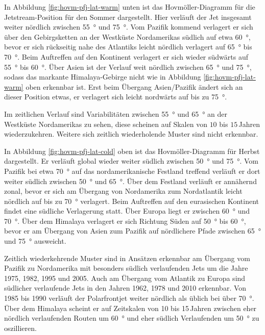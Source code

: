 In Abbildung \ref{fig:hovm-pfj-lat-warm} unten ist das Hovmöller-Diagramm für die Jetstream-Position für den Sommer dargestellt. Hier verläuft der Jet insgesamt weiter nördlich zwischen \SI{55}{\degree} und \SI{75}{\degree}. Vom Pazifik kommend verlagert er sich über den Gebirgsketten an der Westküste Nordamerikas südlich auf etwa \SI{60}{\degree}, bevor er sich rückseitig nahe des Atlantiks leicht nördlich verlagert auf \SI{65}{\degree} bis \SI{70}{\degree}. Beim Auftreffen auf den Kontinent verlagert er sich wieder südwärts auf \SI{55}{\degree} bis \SI{60}{\degree}. Über Asien ist der Verlauf weit nördlich zwischen \SI{65}{\degree} und \SI{75}{\degree}, sodass das markante Himalaya-Gebirge nicht wie in Abbildung \ref{fig:hovm-pfj-lat-warm} oben erkennbar ist. Erst beim Übergang Asien/Pazifik ändert sich an dieser Position etwas, er verlagert sich leicht nordwärts auf bis zu \SI{75}{\degree}.

Im zeitlichen Verlauf sind Variabilitäten zwischen \SI{55}{\degree} und \SI{65}{\degree} an der Westküste Nordamerikas zu sehen, diese scheinen auf Skalen von $10$ bis $15$\,Jahren wiederzukehren. Weitere sich zeitlich wiederholende Muster sind nicht erkennbar.

In Abbildung \ref{fig:hovm-pfj-lat-cold} oben ist das Hovmöller-Diagramm für Herbst dargestellt. Er verläuft global wieder weiter südlich zwischen \SI{50}{\degree} und \SI{75}{\degree}. Vom Pazifik bei etwa \SI{70}{\degree} auf das nordamerikanische Festland treffend verläuft er dort weiter südlich zwischen \SI{50}{\degree} und \SI{65}{\degree}. Über dem Festland verläuft er annähernd zonal, bevor er sich am Übergang von Nordamerika zum Nordatlantik leicht nördlich auf bis zu \SI{70}{\degree} verlagert. Beim Auftreffen auf den eurasischen Kontinent findet eine südliche Verlagerung statt. Über Europa liegt er zwischen \SI{60}{\degree} und \SI{70}{\degree}. Über dem Himalaya verlagert er sich Richtung Süden auf \SI{50}{\degree} bis \SI{60}{\degree}, bevor er am Übergang von Asien zum Pazifik auf nördlichere Pfade zwischen \SI{65}{\degree} und \SI{75}{\degree} ausweicht.

Zeitlich wiederkehrende Muster sind in Ansätzen erkennbar am Übergang vom Pazifik zu Nordamerika mit besonders südlich verlaufenden Jets um die Jahre 1975, 1982, 1995 und 2005. Auch am Übergang vom Atlantik zu Europa sind südlicher verlaufende Jets in den Jahren 1962, 1978 und 2010 erkennbar. Von 1985 bis 1990 verläuft der Polarfrontjet weiter nördlich als üblich bei über \SI{70}{\degree}. Über dem Himalaya scheint er auf Zeitskalen von 10 bis 15\,Jahren zwischen eher nördlich verlaufenden Routen um \SI{60}{\degree} und eher südlich Verlaufenden um \SI{50}{\degree} zu oszillieren.

